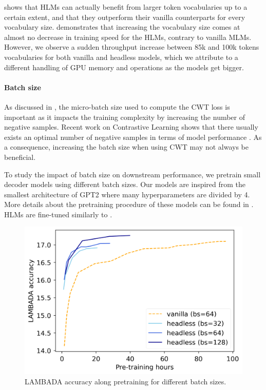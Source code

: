  shows that HLMs can actually benefit from larger token vocabularies up to a certain extent, and that they outperform their vanilla counterparts for every vocabulary size.  demonstrates that increasing the vocabulary size comes at almost no decrease in training speed for the HLMs, contrary to vanilla MLMs. However, we observe a sudden throughput increase between 85k and 100k tokens vocabularies for both vanilla and headless models, which we attribute to a different handling of GPU memory and operations as the models get bigger.

\paragraph{Batch size}

As discussed in , the micro-batch size used to compute the CWT loss is important as it impacts the training complexity by increasing the number of negative samples. Recent work on Contrastive Learning shows that there usually exists an optimal number of negative samples in terms of model performance \citep{contr1, contr2}. As a consequence, increasing the batch size when using CWT may not always be beneficial.

To study the impact of batch size on downstream performance, we pretrain small decoder models using different batch sizes. Our models are inspired from the smallest architecture of GPT2 \citep{gpt2} where many hyperparameters are divided by 4. More details about the pretraining procedure of these models can be found in . HLMs are fine-tuned similarly to .

\begin{figure}[h]
    \centering
    \includegraphics[width=0.70\linewidth]{sources/part_2/headless/imgs/batch_size_hours_p13.png}
    \caption{LAMBADA accuracy along pretraining for different batch sizes.}
    \label{fig:batch_size}
\end{figure}

